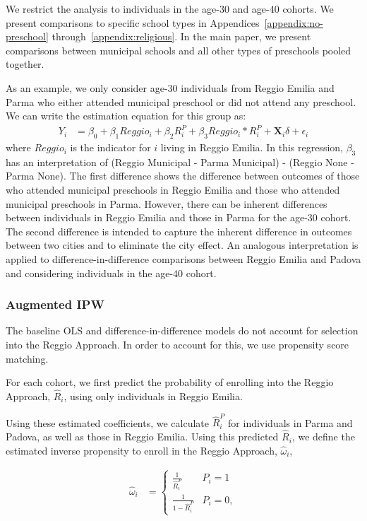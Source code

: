 We restrict the analysis to individuals in the age-30 and age-40 cohorts. We present comparisons to specific school types in Appendices~\ref{appendix:no-preschool} through~\ref{appendix:religious}. In the main paper, we present comparisons between municipal schools and all other types of preschools pooled together.

As an example, we only consider age-30 individuals from Reggio Emilia and Parma who either attended municipal preschool or did not attend any preschool. We can write the estimation equation for this group as:
\begin{eqnarray}  \label{eq:specific2}
Y_i & = \beta_0 + \beta_1 Reggio_i + \beta_2 R_i^P + \beta_3 Reggio_i * R_i^P + \bm{X}_i\delta + \epsilon_i 
\end{eqnarray}
where $Reggio_i$ is the indicator for $i$ living in Reggio Emilia. In this regression, $\beta_3$ has an interpretation of (Reggio Municipal - Parma Municipal) - (Reggio None - Parma None). The first difference shows the difference between outcomes of those who attended municipal preschools in Reggio Emilia and those who attended municipal preschools in Parma. However, there can be inherent differences between individuals in Reggio Emilia and those in Parma for the age-30 cohort. The second difference is intended to capture the inherent difference in outcomes between two cities and to eliminate the city effect. An analogous interpretation is applied to difference-in-difference comparisons between Reggio Emilia and Padova and considering individuals in the age-40 cohort. 

\subsubsection{Augmented IPW}
The baseline OLS and difference-in-difference models do not account for selection into the Reggio Approach. In order to account for this, we use propensity score matching.

For each cohort, we first predict the probability of enrolling into the Reggio Approach, $\hat{R}_i$, using only individuals in Reggio Emilia. 

Using these estimated coefficients, we calculate $\hat{R}_i^{P}$ for individuals in Parma and Padova, as well as those in Reggio Emilia. Using this predicted $\hat{R}_i$, we define the estimated inverse propensity to enroll in the Reggio Approach, $\hat{\omega}_i$,

\begin{align}
	\hat{\omega}_i &= 
	\begin{cases}
		\frac{1}{\hat{R}_i^{P}} & P_i = 1  \\
		\frac{1}{1-\hat{R}_i^{P}} & P_i = 0,
	\end{cases}
\end{align}

